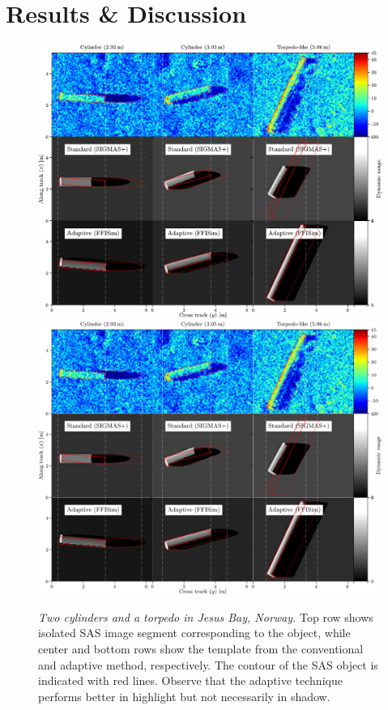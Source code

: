 \section{Results \& Discussion}

\begin{figure}[t]\centering%
\ifOverLeaf%
  \includegraphics[width=.8\linewidth]{gfx/fig_images_sonar_simulator_tagged.pdf}%
\else%
  \includegraphics[width=.8\linewidth]{gfx/fig_images_sonar_simulator_tagged.svg}%
\fi
\caption{\emph{Two cylinders and a torpedo in Jesus Bay, Norway.} Top row shows isolated SAS image segment corresponding to the object, while center and bottom rows show the template from the conventional and adaptive method, respectively. The contour of the SAS object is indicated with red lines. Observe that the adaptive technique performs better in highlight but not necessarily in shadow.}\label{IV_fig_images_sonar_simulation}%
\end{figure}

